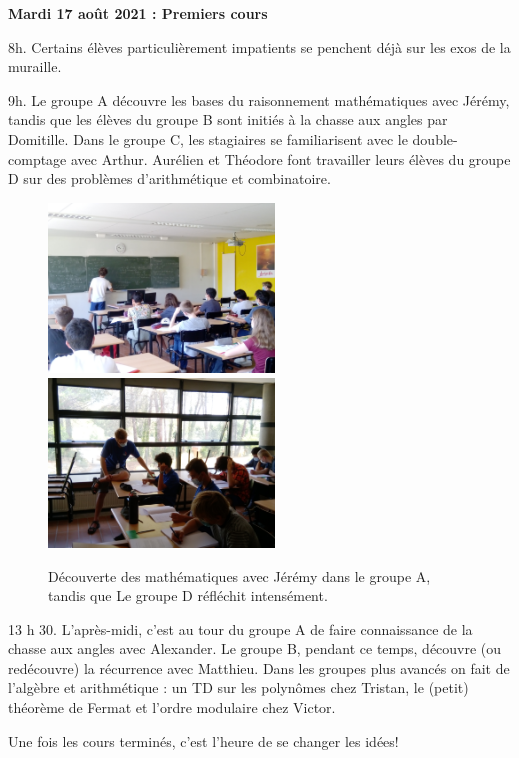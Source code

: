 \begin{center}
{\textbf{Mardi 17 août 2021 : Premiers cours}}
\end{center}
\vspace{2mm}

8h. Certains élèves particulièrement impatients se penchent déjà sur les exos de la muraille.

9h. Le groupe A découvre les bases du raisonnement mathématiques avec Jérémy, tandis que les élèves du groupe B sont initiés à la chasse aux angles par Domitille. Dans le groupe C, les stagiaires se familiarisent avec le double-comptage avec Arthur. Aurélien et Théodore font travailler leurs élèves du groupe D sur des problèmes d’arithmétique et combinatoire.

\begin{figure}[H]
\centering\includegraphics[width=6cm]{CR-17-0.jpg}\hspace{2cm}\includegraphics[width=6cm]{CR-17-1.jpg}
\caption{Découverte des mathématiques avec Jérémy dans le groupe A, tandis que Le groupe D réfléchit intensément.}
\end{figure}

13 h 30. L’après-midi, c’est au tour du groupe A de faire connaissance de la chasse aux angles avec Alexander. Le groupe B, pendant ce temps, découvre (ou redécouvre) la récurrence avec Matthieu. Dans les groupes plus avancés on fait de l’algèbre et arithmétique : un TD sur les polynômes chez Tristan, le (petit) théorème de Fermat et l’ordre modulaire chez Victor.

Une fois les cours terminés, c’est l’heure de se changer les idées!

